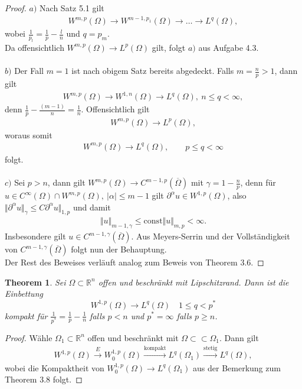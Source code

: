 \documentclass[
paper=a4,
bibtotocnumbered,
liststotocnumbered,
tablecaptionabove,
pointlessnumbers,
twoside,
openright,
10pt
]
{report}
\newtheorem{thm}{Theorem}[chapter]
\theoremstyle{definition}
\numberwithin{equation}{chapter}
\begin{document}
\begin{proof}
$a)$ Nach Satz 5.1 gilt
\begin{align*}
W^{m,p}(\Omega) \rightarrow W^{m-1,p_1} (\Omega) \rightarrow \ldots \rightarrow L^q(\Omega),
\end{align*}
wobei $\frac{1}{p_l}= \frac{1}{p} - \frac{l}{n}$ und $q = p_m$.
\\ Da offensichtlich $W^{m,p}(\Omega) \rightarrow L^p(\Omega)$ gilt, folgt $a)$ aus Aufgabe 4.3.
\\
\\$b)$ Der Fall $m=1$ ist nach obigem Satz bereits abgedeckt. Falls $m= \frac{n}{p}>1$, dann gilt
\begin{align*}
W^{m,p}(\Omega) \rightarrow W^{1,n}(\Omega) \rightarrow L^q(\Omega), \ n \leq q < \infty,
\end{align*}
denn $\frac{1}{p} - \frac{(m-1)}{n} = \frac{1}{n}.$ Offensichtlich gilt
\begin{align*}
W^{m,p}(\Omega) \rightarrow L^p (\Omega),
\end{align*}
woraus somit
\begin{align*}
W^{m,p}(\Omega) \rightarrow L^q (\Omega), \qquad p \leq q < \infty
\end{align*}
folgt.
\\
\\$c)$ Sei $p>n$, dann gilt $W^{m,p}(\Omega) \rightarrow C^{m-1,p}(\overline{\Omega})$ mit $\gamma = 1 - \frac{n}{p}$, denn für $u \in C^{\infty}(\Omega) \cap W^{m,p}(\Omega), \ |\alpha| \leq m-1$ gilt $\partial^{\alpha}u \in W^{1,p}(\Omega)$, also $\Vert \partial^{\alpha}u \Vert_{\gamma} \leq C \partial^{\alpha}u \Vert_{1,p}$ und damit
\begin{align*}
\Vert u \Vert_{m-1, \gamma} \leq \text{const} \Vert u \Vert_{m,p} < \infty.
\end{align*}
Insbesondere gilt $u \in C^{m-1, \gamma}(\overline{\Omega})$. Aus Meyers-Serrin und der Vollständigkeit von $C^{m-1,\gamma}(\overline{\Omega})$ folgt nun der Behauptung.
\\ Der Rest des Beweises verläuft analog zum Beweis von Theorem 3.6.
\end{proof}
\begin{thm}
Sei $\Omega \subset \mathbb R^n$ offen und beschränkt mit Lipschitzrand. Dann ist die Einbettung
\begin{equation}
W^{1,p}(\Omega) \to L^q(\Omega) \quad 1\le q < p^*
\end{equation}
kompakt für $\frac{1}{p^*}= \frac{1}{p} - \frac{1}{n}$ falls $p<n$ und $p^*=\infty$ falls $p \ge n$.
\end{thm}
\begin{proof}
Wähle $\Omega_1 \subset \mathbb{R}^n$ offen und beschränkt mit $\Omega \subset \subset \Omega_1.$ Dann gilt
\begin{align*}
W^{1,p}(\Omega) \overset{E}{\rightarrow} W_0^{1,p}(\Omega) \overset{\text{kompakt}}{\rightarrow} L^q(\Omega_1) \overset{\text{stetig}}{\rightarrow} L^q(\Omega),
\end{align*}
wobei die Kompaktheit von $W_0^{1,p}(\Omega) \rightarrow L^q(\Omega_1)$ aus der Bemerkung zum Theorem 3.8 folgt.
\end{proof}
\end{document}
